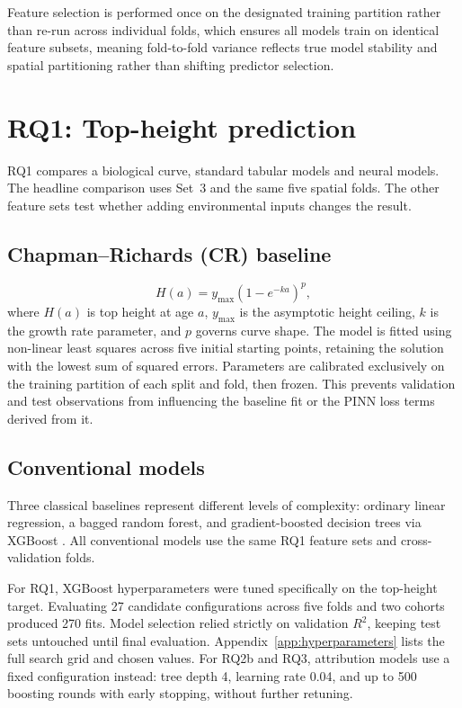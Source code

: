 \documentclass[logo,msc,ai]{infthesis}           %
\begin{document}
Feature selection is performed once on the designated training partition rather than re-run across individual folds, which ensures all models train on identical feature subsets, meaning fold-to-fold variance reflects true model stability and spatial partitioning rather than shifting predictor selection.

\section{RQ1: Top-height prediction}
\label{sec:rq1-method}

RQ1 compares a biological curve, standard tabular models and neural models. The headline
comparison uses Set~3 and the same five spatial folds. The other feature sets test whether adding
environmental inputs changes the result.

\subsection{Chapman--Richards (CR) baseline}
\begin{equation}
H(a) = y_{\max}\left(1 - e^{-ka}\right)^p,
\label{eq:cr}
\end{equation}
where $H(a)$ is top height at age $a$, $y_{\max}$ is the asymptotic height ceiling, $k$ is the growth rate parameter, and $p$ governs curve shape. The model is fitted using non-linear least squares across five initial starting points, retaining the solution with the lowest sum of squared errors. Parameters are calibrated exclusively on the training partition of each split and fold, then frozen. This prevents validation and test observations from influencing the baseline fit or the PINN loss terms derived from it.

\subsection*{Conventional models}
Three classical baselines represent different levels of complexity: ordinary linear regression, a bagged random forest, and gradient-boosted decision trees via XGBoost \cite{chen2016XGBoost_C4_NN}. All conventional models use the same RQ1 feature sets and cross-validation folds.

For RQ1, XGBoost hyperparameters were tuned specifically on the top-height target. Evaluating 27 candidate configurations across five folds and two cohorts produced 270 fits. Model selection relied strictly on validation $R^2$, keeping test sets untouched until final evaluation. Appendix~\ref{app:hyperparameters} lists the full search grid and chosen values. For RQ2b and RQ3, attribution models use a fixed configuration instead: tree depth 4, learning rate 0.04, and up to 500 boosting rounds with early stopping, without further retuning.
\end{document}
